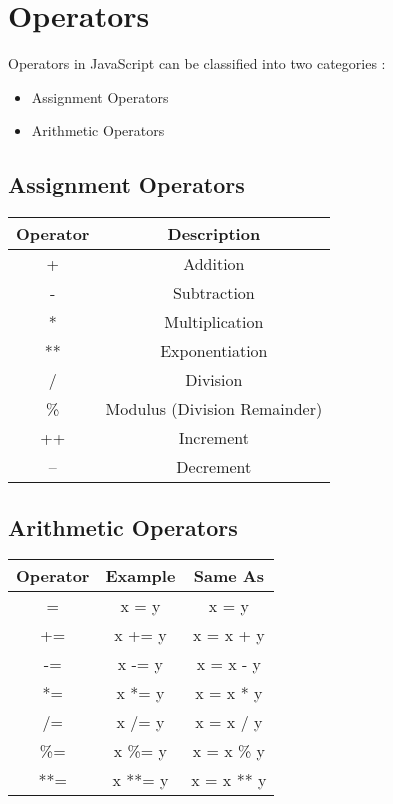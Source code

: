 \documentclass[twoside,12pt]{report}  %
\begin{document}
	\chapter{Operators}
	
	Operators in JavaScript can be classified into two categories :
	\begin{itemize}
		\item Assignment Operators
		\item Arithmetic Operators
	\end{itemize}
	
	\section{Assignment Operators}
	
	\begin{table}[H]
		\centering
		\begin{tabular}{c|c}
			\textbf{Operator} & \textbf{Description}         \\ \hline
			+                 & Addition                     \\
			-                 & Subtraction                  \\
			*                 & Multiplication               \\
			**                & Exponentiation               \\
			/                 & Division                     \\
			\%                & Modulus (Division Remainder) \\
			++                & Increment                    \\
			--                & Decrement                   
		\end{tabular}
	\end{table}	

	\section{Arithmetic Operators}
	
	
	\begin{table}[H]
		\centering
		\begin{tabular}{c|c|c}
			\textbf{Operator} & \textbf{Example} & \textbf{Same As} \\ \hline
			=                 & x = y            & x = y            \\
			+=                & x += y           & x = x + y        \\
			-=                & x -= y           & x = x - y        \\
			*=                & x *= y           & x = x * y        \\
			/=                & x /= y           & x = x / y        \\
			\%=               & x \%= y          & x = x \% y       \\
			**=               & x **= y          & x = x ** y      
		\end{tabular}
	\end{table}
\end{document}
